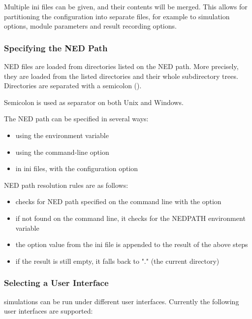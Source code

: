 Multiple ini files can be given, and their contents will be merged. This
allows for partitioning the configuration into separate files, for example
to simulation options, module parameters and result recording options.


\subsubsection{Specifying the NED Path}

NED files are loaded from directories listed on the NED path. More precisely,
they are loaded from the listed directories and their whole subdirectory trees.
Directories are separated with a semicolon (\ttt{;}).

\begin{note}
Semicolon is used as separator on both Unix and Windows.
\end{note}

The NED path can be specified in several ways:
\begin{itemize}
  \item using the  environment variable
  \item using the  command-line option
  \item in ini files, with the  configuration option
\end{itemize}

NED path resolution rules are as follows:

\begin{itemize}
  \item {\opp} checks for NED path specified on the command line with the  option
  \item if not found on the command line, it checks for the NEDPATH environment variable
  \item the  option value from the ini file is appended to the result of the above steps
  \item if the result is still empty, it falls back to "." (the current directory)
\end{itemize}


\subsubsection{Selecting a User Interface}

{\opp} simulations can be run under different user interfaces.
Currently the following user interfaces are supported:

